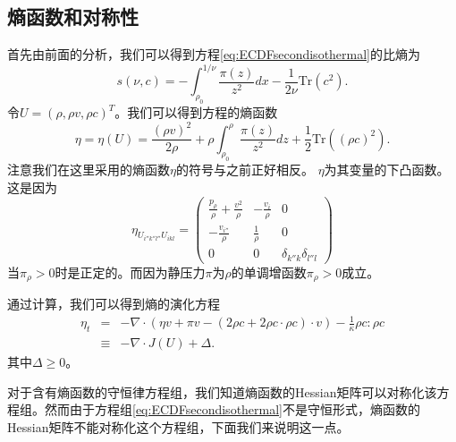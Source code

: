 \subsection{熵函数和对称性}
首先由前面的分析，我们可以得到方程\eqref{eq:ECDFsecondisothermal}的比熵为
\begin{equation*}
	s (\nu, c ) =  -\int_{\rho_0}^{1/\nu} \frac{\pi(z)}{z^2} dx - \frac{1}{2 \nu}  \mbox{Tr} (c^2).
\end{equation*}
令$U = (\rho, \rho v, \rho c)^T$。我们可以得到方程的熵函数
\begin{equation*}
	\eta = \eta(U) = \frac{(\rho v)^2}{2\rho}+\rho \int_{\rho_0}^{\rho} \frac{\pi(z)}{z^2} dz + \frac{1}{2}  \mbox{Tr} \left((\rho c)^2\right).
\end{equation*}
注意我们在这里采用的熵函数$\eta$的符号与之前正好相反。%
$\eta$为其变量的下凸函数。这是因为
\begin{equation*}
	\eta_{U_{i''k''l''}U_{ikl}} = \left( \begin{array}{ccc} 
		\frac{p_\rho}{\rho} + \frac{v^2}{\rho} & -\frac{v_i}{\rho} & 0 \\
		-\frac{v_{i''}}{\rho} & \frac{1}{\rho} & 0 \\
		0 & 0 & \delta_{k''k}\delta_{l''l}
	\end{array}\right)
\end{equation*}
当$\pi_\rho>0$时是正定的。而因为静压力$\pi$为$\rho$的单调增函数$\pi_\rho>0$成立。

通过计算，我们可以得到熵的演化方程
\begin{eqnarray}\label{23}
	\eta_t &=&  - \nabla \cdot ( \eta v+ \pi v - (2\rho c + 2 \rho c \cdot \rho c) \cdot v) - \frac{1}{\kappa} \rho c: \rho c \nonumber\\
  &\equiv& -\nabla \cdot J(U) + \Delta.	
\end{eqnarray}
其中$\Delta \ge 0$。

对于含有熵函数的守恒律方程组\cite{friedrichs1971systems}，我们知道熵函数的Hessian矩阵可以对称化该方程组。然而由于方程组\eqref{eq:ECDFsecondisothermal}不是守恒形式，熵函数的Hessian矩阵不能对称化这个方程组，下面我们来说明这一点。

